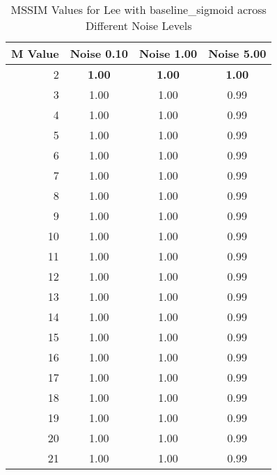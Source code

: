     \begin{table}[htb]
       \small

    \centering 
    \begin{tabular}{|r|ccc|}\hline
   M Value &  Noise 0.10 &  Noise 1.00 &  Noise 5.00 \\ \hline 
      2 &  \textbf{1.00} &  \textbf{1.00} &  \textbf{1.00}  \\ \hline 
      3 &  1.00 &  1.00 &  0.99  \\ \hline 
      4 &  1.00 &  1.00 &  0.99  \\ \hline 
      5 &  1.00 &  1.00 &  0.99  \\ \hline 
      6 &  1.00 &  1.00 &  0.99  \\ \hline 
      7 &  1.00 &  1.00 &  0.99  \\ \hline 
      8 &  1.00 &  1.00 &  0.99  \\ \hline 
      9 &  1.00 &  1.00 &  0.99  \\ \hline 
      10 &  1.00 &  1.00 &  0.99  \\ \hline 
      11 &  1.00 &  1.00 &  0.99  \\ \hline 
      12 &  1.00 &  1.00 &  0.99  \\ \hline 
      13 &  1.00 &  1.00 &  0.99  \\ \hline 
      14 &  1.00 &  1.00 &  0.99  \\ \hline 
      15 &  1.00 &  1.00 &  0.99  \\ \hline 
      16 &  1.00 &  1.00 &  0.99  \\ \hline 
      17 &  1.00 &  1.00 &  0.99  \\ \hline 
      18 &  1.00 &  1.00 &  0.99  \\ \hline 
      19 &  1.00 &  1.00 &  0.99  \\ \hline 
      20 &  1.00 &  1.00 &  0.99  \\ \hline 
      21 &  1.00 &  1.00 &  0.99  \\ \hline 
    \end{tabular}
    \caption{MSSIM Values for Lee with baseline_sigmoid across Different Noise Levels}
    \end{table}



